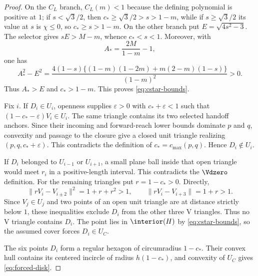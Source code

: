 \begin{proof}
On the $C_L$ branch, $C_L(m)<1$ because the defining polynomial is positive
at $1$; if $s<\sqrt3/2$, then $c_*\ge\sqrt3/2>s>1-m$, while if
$s\ge\sqrt3/2$ its value at $s$ is $\chi\le0$, so $c_*\ge s>1-m$.
On the other branch put $E=\sqrt{4s^2-3}$.  The selector gives
$sE>M-m$, whence $c_*<s<1$.  Moreover, with
\[
 A_*=\frac{2M}{1-m}-1,
\]
one has
\[
 A_*^2-E^2=
 \frac{4(1-s)\{(1-m)(1-2m)+m(2-m)(1-s)\}}{(1-m)^2}>0.
\]
Thus $A_*>E$ and $c_*>1-m$.  This proves
\eqref{eq:cstar-bounds}.

Fix $i$.  If $D_i\in U_i$, openness supplies $\varepsilon>0$ with
$c_*+\varepsilon<1$ such that
$(1-c_*-\varepsilon)V_i\in U_i$.  The same triangle contains its two selected
handoff anchors.  Since their incoming and forward-reach lower bounds dominate $p$ and
$q$, convexity and passage to the closure give a closed unit triangle
realizing $(p,q,c_*+\varepsilon)$.  This contradicts the definition of
$c_*=c_{\max}(p,q)$.  Hence $D_i\notin U_i$.

If $D_i$ belonged to $U_{i-1}$ or $U_{i+1}$, a small plane ball inside that
open triangle would meet $r_i$ in a positive-length
interval.  This contradicts the $\Vdzero$ definition.  For the remaining
triangles put $r=1-c_*>0$.  Directly,
\[
 \lVert rV_i-V_{i\pm2}\rVert^2=1+r+r^2>1,
 \qquad
 \lVert rV_i-V_{i+3}\rVert=1+r>1.
\]
Since $V_j\in U_j$ and two points of an open unit triangle are at distance
strictly below $1$, these inequalities exclude $D_i$ from the other three
V triangles.  Thus no V triangle contains $D_i$.  The point lies in
$\interior(H)$ by \eqref{eq:cstar-bounds}, so the assumed cover forces
$D_i\in U_C$.

The six points $D_i$ form a regular hexagon of circumradius $1-c_*$.  Their
convex hull contains its centered incircle of radius $h(1-c_*)$, and convexity
of $U_C$ gives \eqref{eq:forced-disk}.
\end{proof}

